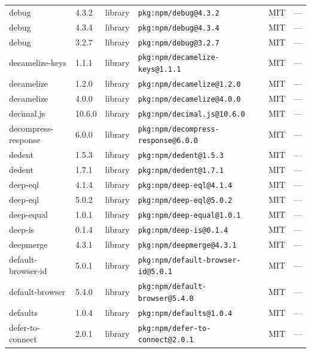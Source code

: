 \documentclass[11pt,a4paper]{article}
\begin{document}
\begin{longtable}{|p{4cm}|p{2cm}|p{1.6cm}|p{5cm}|p{1.5cm}|p{3.5cm}|}
\raggedright debug & 4.3.2 & library & \small\texttt{pkg:npm/debug@4.3.2} & MIT & \small — \\
\raggedright debug & 4.3.4 & library & \small\texttt{pkg:npm/debug@4.3.4} & MIT & \small — \\
\raggedright debug & 3.2.7 & library & \small\texttt{pkg:npm/debug@3.2.7} & MIT & \small — \\
\raggedright decamelize-keys & 1.1.1 & library & \small\texttt{pkg:npm/decamelize-keys@1.1.1} & MIT & \small — \\
\raggedright decamelize & 1.2.0 & library & \small\texttt{pkg:npm/decamelize@1.2.0} & MIT & \small — \\
\raggedright decamelize & 4.0.0 & library & \small\texttt{pkg:npm/decamelize@4.0.0} & MIT & \small — \\
\raggedright decimal.js & 10.6.0 & library & \small\texttt{pkg:npm/decimal.js@10.6.0} & MIT & \small — \\
\raggedright decompress-response & 6.0.0 & library & \small\texttt{pkg:npm/decompress-response@6.0.0} & MIT & \small — \\
\raggedright dedent & 1.5.3 & library & \small\texttt{pkg:npm/dedent@1.5.3} & MIT & \small — \\
\raggedright dedent & 1.7.1 & library & \small\texttt{pkg:npm/dedent@1.7.1} & MIT & \small — \\
\raggedright deep-eql & 4.1.4 & library & \small\texttt{pkg:npm/deep-eql@4.1.4} & MIT & \small — \\
\raggedright deep-eql & 5.0.2 & library & \small\texttt{pkg:npm/deep-eql@5.0.2} & MIT & \small — \\
\raggedright deep-equal & 1.0.1 & library & \small\texttt{pkg:npm/deep-equal@1.0.1} & MIT & \small — \\
\raggedright deep-is & 0.1.4 & library & \small\texttt{pkg:npm/deep-is@0.1.4} & MIT & \small — \\
\raggedright deepmerge & 4.3.1 & library & \small\texttt{pkg:npm/deepmerge@4.3.1} & MIT & \small — \\
\raggedright default-browser-id & 5.0.1 & library & \small\texttt{pkg:npm/default-browser-id@5.0.1} & MIT & \small — \\
\raggedright default-browser & 5.4.0 & library & \small\texttt{pkg:npm/default-browser@5.4.0} & MIT & \small — \\
\raggedright defaults & 1.0.4 & library & \small\texttt{pkg:npm/defaults@1.0.4} & MIT & \small — \\
\raggedright defer-to-connect & 2.0.1 & library & \small\texttt{pkg:npm/defer-to-connect@2.0.1} & MIT & \small — \\

\end{longtable}
\end{document}
